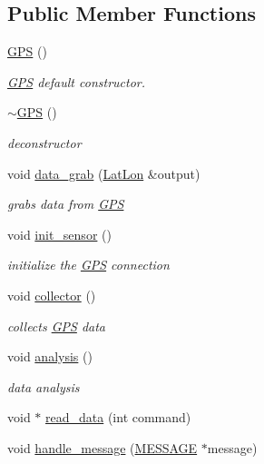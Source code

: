 \subsection*{Public Member Functions}
\begin{DoxyCompactItemize}
\item 
\hyperlink{classGPS_a0c347a188512d0d5cf7ed5c91b145fc4}{G\-P\-S} ()
\begin{DoxyCompactList}\small\item\em \hyperlink{classGPS}{G\-P\-S} default constructor. \end{DoxyCompactList}\item 
\hypertarget{classGPS_afe84b00ea93254fcb8b84a0f2b240c9d}{\hyperlink{classGPS_afe84b00ea93254fcb8b84a0f2b240c9d}{$\sim$\-G\-P\-S} ()}\label{classGPS_afe84b00ea93254fcb8b84a0f2b240c9d}

\begin{DoxyCompactList}\small\item\em deconstructor \end{DoxyCompactList}\item 
void \hyperlink{classGPS_acd4e4d75709b2b897972f4ff89a2bdab}{data\-\_\-grab} (\hyperlink{classGPS_1_1LatLon}{Lat\-Lon} \&output)
\begin{DoxyCompactList}\small\item\em grabs data from \hyperlink{classGPS}{G\-P\-S} \end{DoxyCompactList}\item 
\hypertarget{classGPS_aebb999362899800a7e372e873bb5b943}{void \hyperlink{classGPS_aebb999362899800a7e372e873bb5b943}{init\-\_\-sensor} ()}\label{classGPS_aebb999362899800a7e372e873bb5b943}

\begin{DoxyCompactList}\small\item\em initialize the \hyperlink{classGPS}{G\-P\-S} connection \end{DoxyCompactList}\item 
void \hyperlink{classGPS_a17383568c4ed86a0adfdd5c88b6591d4}{collector} ()
\begin{DoxyCompactList}\small\item\em collects \hyperlink{classGPS}{G\-P\-S} data \end{DoxyCompactList}\item 
void \hyperlink{classGPS_a4dca50736c5e49f831515219536823b2}{analysis} ()
\begin{DoxyCompactList}\small\item\em data analysis \end{DoxyCompactList}\item 
void $\ast$ \hyperlink{classGPS_aa04076536ee9f7e2679895c69b07ad58}{read\-\_\-data} (int command)
\item 
\hypertarget{classGPS_a803a498352e30044136502a9e036d380}{void \hyperlink{classGPS_a803a498352e30044136502a9e036d380}{handle\-\_\-message} (\hyperlink{SUBSYS__COMMANDS_8h_ad814416fc1a8c675bea2687d96088a8f}{M\-E\-S\-S\-A\-G\-E} $\ast$message)}\label{classGPS_a803a498352e30044136502a9e036d380}


\end{DoxyCompactItemize}
